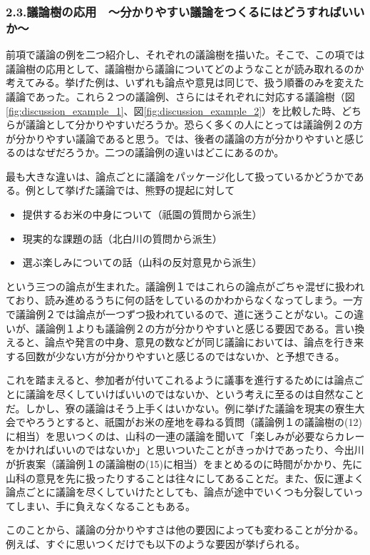 \subsubsection{2.3.議論樹の応用　～分かりやすい議論をつくるにはどうすればいいか～}
前項で議論の例を二つ紹介し、それぞれの議論樹を描いた。そこで、この項では議論樹の応用として、議論樹から議論についてどのようなことが読み取れるのか考えてみる。挙げた例は、いずれも論点や意見は同じで、扱う順番のみを変えた議論であった。これら２つの議論例、さらにはそれぞれに対応する議論樹（図\ref{fig:discussion_example_1}、図\ref{fig:discussion_example_2}）を比較した時、どちらが議論として分かりやすいだろうか。恐らく多くの人にとっては議論例２の方が分かりやすい議論であると思う。では、後者の議論の方が分かりやすいと感じるのはなぜだろうか。二つの議論例の違いはどこにあるのか。
\par
最も大きな違いは、論点ごとに議論をパッケージ化して扱っているかどうかである。例として挙げた議論では、熊野の提起に対して
\begin{itemize}
  \item 提供するお米の中身について（祇園の質問から派生）
  \item 現実的な課題の話（北白川の質問から派生）
  \item 選ぶ楽しみについての話（山科の反対意見から派生）
\end{itemize}
という三つの論点が生まれた。議論例１ではこれらの論点がごちゃ混ぜに扱われており、読み進めるうちに何の話をしているのかわからなくなってしまう。一方で議論例２では論点が一つずつ扱われているので、道に迷うことがない。この違いが、議論例１よりも議論例２の方が分かりやすいと感じる要因である。言い換えると、論点や発言の中身、意見の数などが同じ議論においては、論点を行き来する回数が少ない方が分かりやすいと感じるのではないか、と予想できる。
\par
これを踏まえると、参加者が付いてこれるように議事を進行するためには論点ごとに議論を尽くしていけばいいのではないか、という考えに至るのは自然なことだ。しかし、寮の議論はそう上手くはいかない。例に挙げた議論を現実の寮生大会でやろうとすると、祇園がお米の産地を尋ねる質問（議論例１の議論樹の(12)に相当）を思いつくのは、山科の一連の議論を聞いて「楽しみが必要ならカレーをかければいいのではないか」と思いついたことがきっかけであったり、今出川が折衷案（議論例１の議論樹の(15)に相当）をまとめるのに時間がかかり、先に山科の意見を先に扱ったりすることは往々にしてあることだ。また、仮に運よく論点ごとに議論を尽くしていけたとしても、論点が途中でいくつも分裂していってしまい、手に負えなくなることもある。
\par
このことから、議論の分かりやすさは他の要因によっても変わることが分かる。例えば、すぐに思いつくだけでも以下のような要因が挙げられる。
